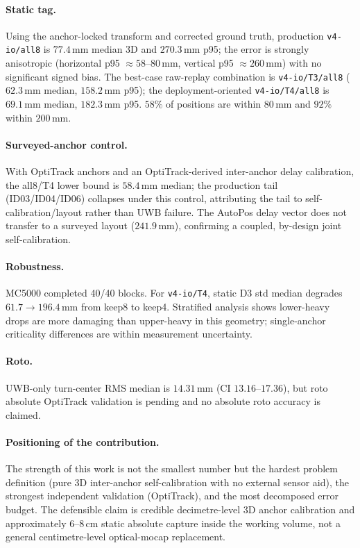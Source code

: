 \documentclass[11pt,a4paper]{article}
\newcommand{\mm}{\,\si{\milli\meter}}
\begin{document}
\paragraph{Static tag.}
Using the anchor-locked transform and corrected ground truth, production \texttt{v4-io/all8}
is $77.4\mm$ median 3D and $270.3\mm$ p95; the error is strongly anisotropic (horizontal p95
$\approx\!58$--$80\mm$, vertical p95 $\approx\!260\mm$) with no significant signed bias. The
best-case raw-replay combination is \texttt{v4-io/T3/all8} ($62.3\mm$ median, $158.2\mm$ p95);
the deployment-oriented \texttt{v4-io/T4/all8} is $69.1\mm$ median, $182.3\mm$ p95. $58\%$ of
positions are within $80\mm$ and $92\%$ within $200\mm$.

\paragraph{Surveyed-anchor control.}
With OptiTrack anchors and an OptiTrack-derived inter-anchor delay calibration, the all8/T4
lower bound is $58.4\mm$ median; the production tail (ID03/ID04/ID06) collapses under this
control, attributing the tail to self-calibration/layout rather than UWB failure. The AutoPos
delay vector does not transfer to a surveyed layout ($241.9\mm$), confirming a coupled,
by-design joint self-calibration.

\paragraph{Robustness.}
MC5000 completed 40/40 blocks. For \texttt{v4-io/T4}, static D3 std median degrades
$61.7\to196.4\mm$ from keep8 to keep4. Stratified analysis shows lower-heavy drops are more
damaging than upper-heavy in this geometry; single-anchor criticality differences are within
measurement uncertainty.

\paragraph{Roto.}
UWB-only turn-center RMS median is $14.31\mm$ (CI $13.16$--$17.36$), but roto absolute
OptiTrack validation is pending and no absolute roto accuracy is claimed.

\paragraph{Positioning of the contribution.}
The strength of this work is not the smallest number but the hardest problem definition (pure
3D inter-anchor self-calibration with no external sensor aid), the strongest independent
validation (OptiTrack), and the most decomposed error budget. The defensible claim is
credible decimetre-level 3D anchor calibration and approximately $6$--$8\,\si{\centi\meter}$
static absolute capture inside the working volume, not a general centimetre-level
optical-mocap replacement.
\end{document}
